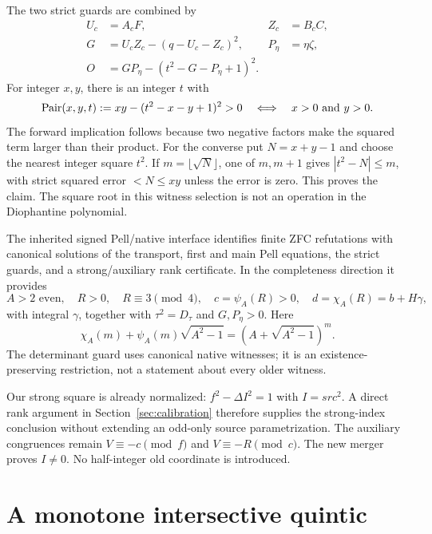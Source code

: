 \documentclass[11pt,a4paper]{article}
\theoremstyle{definition}\newtheorem{definition}[theorem]{Definition}
\theoremstyle{remark}\newtheorem{remark}[theorem]{Remark}
\newcommand{\Dt}{D_{\tau}}\newcommand{\Da}{D_{\mathrm a}}
\numberwithin{equation}{section}
\begin{document}
The two strict guards are combined by
\begin{align}
 U_c&=A_cF,&Z_c&=B_cC,\nonumber\\
 G&=U_cZ_c-(q-U_c-Z_c)^2,&P_\eta&=\eta\zeta,\nonumber\\
 O&=GP_\eta-(t^2-G-P_\eta+1)^2.
 \label{eq:pair12}
\end{align}
For integer $x,y$, there is an integer $t$ with
\begin{equation}
 \operatorname{Pair}(x,y,t):=xy-(t^2-x-y+1)^2>0
 \quad\Longleftrightarrow\quad x>0\text{ and }y>0.
 \label{eq:pairlemma}
\end{equation}
The forward implication follows because two negative factors make the
squared term larger than their product. For the converse put
$N=x+y-1$ and choose the nearest integer square $t^2$. If
$m=\lfloor\sqrt N\rfloor$, one of $m,m+1$ gives
$|t^2-N|\le m$, with strict squared error $<N\le xy$ unless the
error is zero. This proves the claim. The square root in this witness
selection is not an operation in the Diophantine polynomial.

The inherited signed Pell/native interface identifies finite ZFC
refutations with canonical solutions of the transport, first and main
Pell equations, the strict guards, and a strong/auxiliary rank certificate.
In the completeness direction it provides
\begin{equation}
 A>2\text{ even},\quad R>0,\quad R\equiv3\pmod4,\quad
 c=\psi_A(R)>0,\quad d=\chi_A(R)=b+H\gamma,
 \label{eq:canonical}
\end{equation}
with integral $\gamma$, together with $\tau^2=\Dt$ and $G,P_\eta>0$.
Here
\begin{equation}
 \chi_A(m)+\psi_A(m)\sqrt{A^2-1}
   =(A+\sqrt{A^2-1})^m.
 \label{eq:pellseq}
\end{equation}
The determinant guard uses canonical native witnesses; it is an
existence-preserving restriction, not a statement about every older witness.

Our strong square is already normalized: $f^2-\Delta I^2=1$ with
$I=src^2$. A direct rank argument in Section~\ref{sec:calibration}
therefore supplies the strong-index conclusion without extending an
odd-only source parametrization. The auxiliary congruences remain
$V\equiv-c\pmod f$ and $V\equiv-R\pmod c$. The new merger proves
$I\ne0$. No half-integer old coordinate is introduced.

\section{A monotone intersective quintic}
\label{sec:quintic}
\end{document}
